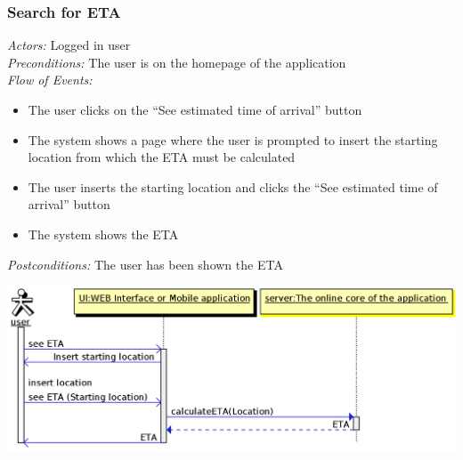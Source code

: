 \documentclass{article}
\begin{document}
\subsubsection{Search for ETA}
\textit{Actors:} Logged in user
\\\textit{Preconditions:} The user is on the homepage of the application
\\\textit{Flow of Events:}
\begin{itemize}
	\item  The user clicks on the ``See estimated time of arrival'' button
	\item  The system shows a page where the user is prompted to insert the starting location from which the ETA must be calculated
	\item  The user inserts the starting location and clicks the ``See estimated time of arrival'' button
	\item  The system shows the ETA 
\end{itemize}
\textit{Postconditions:} The user has been shown the ETA
\begin{center}	
	\includegraphics[width=\textwidth,keepaspectratio]{Sequence-Diagrams/search-for-eta}
\end{center}
\end{document}
